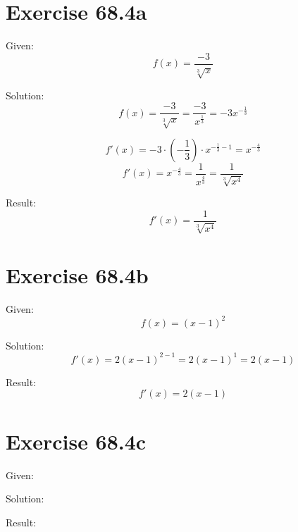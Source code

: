 \documentclass[a4paper, 10pt]{scrartcl}
\begin{document}
\section{Exercise 68.4a}

Given:
\[f(x) = \frac{-3}{\sqrt[3]{x}}\]

Solution:
\[f(x) = \frac{-3}{\sqrt[3]{x}} = \frac{-3}{x^{\frac{1}{3}}} = -3x^{-\frac{1}{3}}\]

\[f'(x) = -3\cdot(-\frac{1}{3})\cdot x^{-\frac{1}{3} - 1} = x^{-\frac{4}{3}}\]
\[f'(x) = x^{-\frac{4}{3}} = \frac{1}{x^{\frac{4}{3}}} = \frac{1}{\sqrt[3]{x^{4}}}\]

Result:
\[f'(x) = \frac{1}{\sqrt[3]{x^{4}}}\]

\section{Exercise 68.4b}

Given:
\[f(x) = (x - 1)^{2}\]

Solution:
\[f'(x) = 2(x - 1)^{2 - 1} = 2(x - 1)^{1} = 2(x - 1)\]

Result:
\[f'(x) = 2(x - 1)\]

\section{Exercise 68.4c}

Given:

Solution:

Result:
\end{document}
